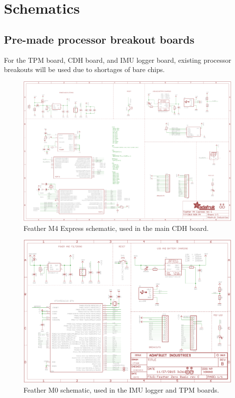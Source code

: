 \documentclass{article}
\begin{document}
\appendix


\section{Schematics}
\label{appa}


\subsection{Pre-made processor breakout boards}
For the TPM board, CDH board, and IMU logger board, existing processor breakouts will be used due to shortages of bare chips.
\begin{figure}[H]
	\centering
	\includegraphics[width=\textwidth]{images/adafruit_featherm4_schematic}
	\caption{Feather M4 Express schematic, used in the main CDH board.}
	\label{fig:schematic-featherm4}
\end{figure}
\begin{figure}[H]
	\centering
	\includegraphics[width=\textwidth]{images/adafruit_featherm0_schematic}
	\caption{Feather M0 schematic, used in the IMU logger and TPM boards.}
	\label{fig:schematic-featherm0}
\end{figure}
\end{document}
